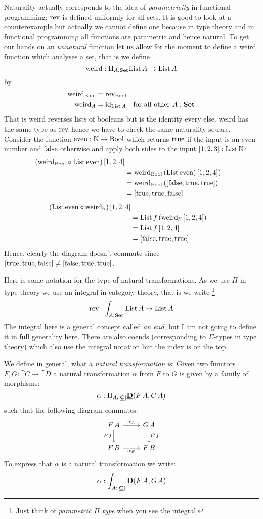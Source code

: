 Naturality actually corresponds to the idea of \emph{parametricity} in functional programming: $\mathrm{rev}$ is defined uniformly for all sets. It is good to look at a counterexample but actually we cannot define one because in type theory and in functional programming all functions are parametric and hence natural. To get our hands on an \emph{unnatural} function let us allow for the moment to define a weird function which analyses a set, that is we define
\[ \mathrm{weird} : \Pi_{A:\mathbf{Set}} \mathrm{List}\,A \to \mathrm{List}\,A\]
by 
\begin{align*}
  \mathrm{weird}_{\mathrm{Bool}} & = \mathrm{rev}_{\mathrm{Bool}} \\
  \mathrm{weird}_A & = \mathrm{id}_{\mathrm{List}\,A} \quad\mbox{for all other $A:\mathbf{Set}$}
\end{align*}
That is weird reverses lists of booleans but is the identity every else. weird has the same type as $\mathrm{rev}$ hence we have to check the same naturality square. Consider the function $\mathrm{even} : \mathbb{N} \to \mathrm{Bool}$ which returns $\mathrm{true}$ if the input is an even number and $\mathrm{false}$ otherwise and apply both sides to the input $[1,2,3]:\mathrm{List}\,\mathbb{N}$:
\begin{align*}
(\mathrm{weird}_{\mathrm{Bool}} \circ \mathrm{List}\,\mathrm{even})\,[1,2,4] \\
& = \mathrm{weird}_{\mathrm{Bool}}\,(\mathrm{List}\,\mathrm{even})\,[1,2,4])  \\
& = \mathrm{weird}_{\mathrm{Bool}}\,([\mathrm{false},\mathrm{true},\mathrm{true}])  \\
& = [\mathrm{true},\mathrm{true},\mathrm{false}]
\end{align*}
\begin{align*}
(\mathrm{List}\,\mathrm{even}\circ \mathrm{weird}_{\mathbb{N}})\, [1,2,4] \\
& = \mathrm{List}\,f\,(\mathrm{weird}_{\mathbb{N}}\, [1,2,4]) \\
& = \mathrm{List}\,f\,[1,2,4] \\
& = [\mathrm{false},\mathrm{true},\mathrm{true}]
\end{align*}
Hence, clearly the diagram doesn't commute since $[\mathrm{true},\mathrm{true},\mathrm{false}] \not= [\mathrm{false},\mathrm{true},\mathrm{true}]$.

Here is some notation for the type of natural transformations. As we use $\Pi$ in type theory we use an integral in category theory, that is we write
\footnote{Just think of \emph{parametric $\Pi$ type} when you see the integral.}
\[ \mathrm{rev} : \int_{A:\mathbf{Set}} \mathrm{List}\,A \to \mathrm{List}\,A \]
The integral here is a general concept called \emph{an end}, but I am not going to define it in full generality here. There are also coends (corresponding to $\Sigma$-types in type theory) which also use the integral notation but the index is on the top.

We define in general, what a \emph{natural transformation} is: Given two functors $F,G : \cat{C} \to \cat{D}$ a natural transformation $\alpha$ from $F$ to $G$ is given by a family of morphisms: 
\[\alpha : \Pi_{A : |\underline{\mathbf{C}}|} \underline{\mathbf{D}}(F\,A,G\,A)\]
such that the following diagram commutes:
\[\begin{tikzcd}
F\,A \arrow[r,"\alpha_A"] \arrow[d,"F\,f" left] & G\,A \arrow[d,"G\,f"]\\
F\,B \arrow[r,"\alpha_B" below] & F\,B
\end{tikzcd}
\]
To express that $\alpha$ is a natural transformation we write:
\[ \alpha : \int_{A : |\underline{\mathbf{C}}|} \underline{\mathbf{D}}(F\,A,G\,A)\]

